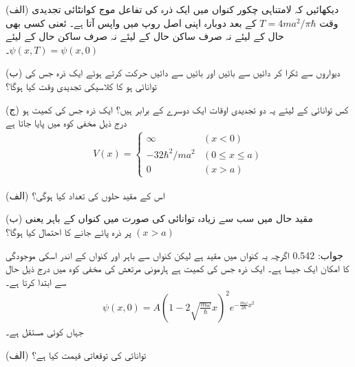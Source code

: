

(الف) دیکھائیں کہ لامتناہی چکور کنواں میں ایک ذرہ کی تفاعل موج کوانٹائی تجدیدی وقت \(T = 4ma^2/\pi\hbar\) کے بعد دوبارہ اپنی اصل روپ میں واپس آتا ہے۔ ئعنی کسی بھی حال کے لیئے نہ صرف ساکن حال کے لیئے نہ صرف ساکن حال کے لیئے \(\psi(x, T) = \psi(x, 0)\)۔

(ب) دیواروں سے ٹکرا کر دائیں سے بائیں اور بائیں سے دائیں حرکت کرتے ہوئے ایک ذرہ جس کی توانائی  ہو کا کلاسیکی تجدیدی وقت کیا ہوگا؟

(ج) کس توانائی کے لیئے یہ دو تجدیدی اوقات ایک دوسرے کے برابر ہیں؟  
ایک ذرہ جس کی کمیت  ہو درج ذیل مخفی کوہ میں پایا جاتا ہے
\begin{align*}
	V(x)=
	\begin{cases}
		\infty & (x<0) \\
		-32\hbar^2/ma^2 & (0\leq x\leq a) \\
		0 & (x>a) 
	\end{cases}
\end{align*}

(الف) اس کے مقید حلوں کی تعداد کیا ہوگی؟

(ب) مقید حال میں سب سے زیادہ توانائی کی صورت میں کنواں کے باہر یعنی \((x>a)\) پر ذرہ پائے جانے کا احتمال کیا ہوگا؟

جواب: \num{0.542} اگرچہ یہ کنواں میں مقید ہے لیکن کنواں سے باہر اور کنواں کے اندر اسکی موجودگی کا امکان ایک جیسا ہے۔  
ایک ذرہ جس کی کمیت  ہے ہارمونی مرتعش کی مخفی کوہ میں درج ذیل حال سے ابتدا کرتا ہے۔
\begin{align*}
	\psi(x, 0) = A(1-2\sqrt{\frac{m\omega}{\hbar}}x)^2e^{-\frac{m\omega}{2\hbar}x^2}
\end{align*}
جہاں  کوئی مستقل ہے۔

(الف) توانائی کی توقعاتی قیمت کیا ہے؟

